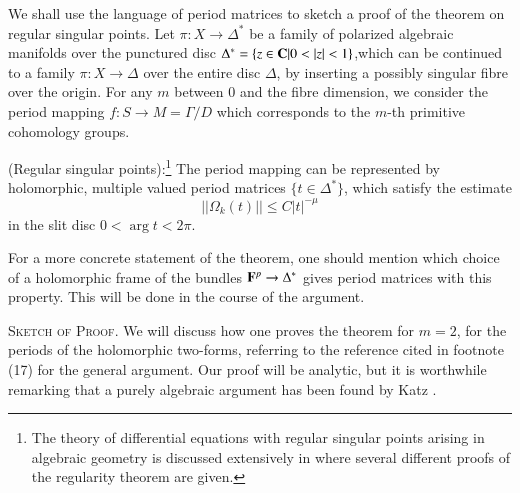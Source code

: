 We shall use the language of period matrices to sketch a proof of the theorem on regular singular points. Let $\pi : X \to \Delta^\ast$  be a family of polarized algebraic manifolds over the punctured disc $\Delta^\ast = \{z \in \mathbf{C} | 0 < |z| < 1\}$,\pageoriginale which can be continued to a family $\pi :X \to \Delta$ over the entire disc $\Delta$, by inserting a possibly  singular fibre over the origin. For any $m$ between 0 and the fibre dimension, we consider the period mapping $f : S \to M = \Gamma / D$ which corresponds to the $m$-th primitive cohomology groups.

\setcounter{theorem}{30}
\begin{theorem}\label{art4-lem3.31}
(Regular singular points):\footnote[17]{The theory of differential equations with regular singular points arising in algebraic geometry is discussed extensively in \cite{art4-key15} where several different proofs of the regularity theorem are given.} The period mapping can be represented by holomorphic, multiple valued period matrices $\{t \in \Delta^\ast\}$, which satisfy the estimate
$$
||\Omega_{k} (t) || \leqslant C |t|^{-\mu}
$$
in the slit disc $0< \arg t < 2\pi$.
\end{theorem}

\begin{remark*}
For a more concrete statement of the theorem, one should mention which choice of a holomorphic frame of the bundles $\mathbf{F}^p \to \Delta^\ast$ gives period matrices with this property. This will be done in the course of the argument.
\end{remark*}

\medskip
\textsc{Sketch of Proof.} We will discuss how one proves the theorem for $m = 2$, \ie for the periods of the holomorphic two-forms, referring to the reference cited in footnote (17) for the general argument. Our proof will be analytic, but it is worthwhile remarking that a purely algebraic argument has been found by Katz \cite{art4-key31}.

